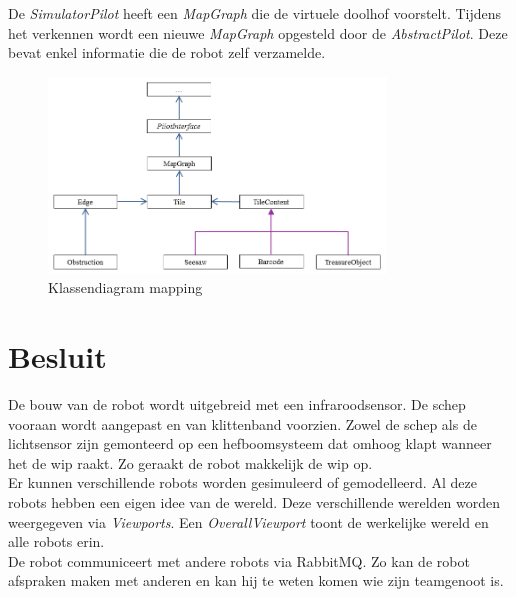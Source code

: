 \documentclass[tt3]{penoverslag}
\begin{document}
De \textit{SimulatorPilot} heeft een \textit{MapGraph} die de virtuele doolhof voorstelt. Tijdens het verkennen wordt een nieuwe \textit{MapGraph} opgesteld door de \textit{AbstractPilot}. Deze bevat enkel informatie die de robot zelf verzamelde.

\begin{figure}[h]
\centering
	\includegraphics[width=0.8\textwidth]{klasMapping}
\caption{Klassendiagram mapping}
\label{fig:klasMap}
\end{figure}


\section{Besluit}
\label{sec:Besluit}
De bouw van de robot wordt uitgebreid met een infraroodsensor. De schep vooraan wordt aangepast en van klittenband voorzien. Zowel de schep als de lichtsensor zijn gemonteerd op een hefboomsysteem dat omhoog klapt wanneer het de wip raakt. Zo geraakt de robot makkelijk de wip op.\\

Er kunnen verschillende robots worden gesimuleerd of gemodelleerd. Al deze robots hebben een eigen idee van de wereld. Deze verschillende werelden worden weergegeven via \textit{Viewports}. Een \textit{OverallViewport} toont de werkelijke wereld en alle robots erin.\\

De robot communiceert met andere robots via RabbitMQ. Zo kan de robot afspraken maken met anderen en kan hij te weten komen wie zijn teamgenoot is.


\newpage
\makeappendix
\end{document}

